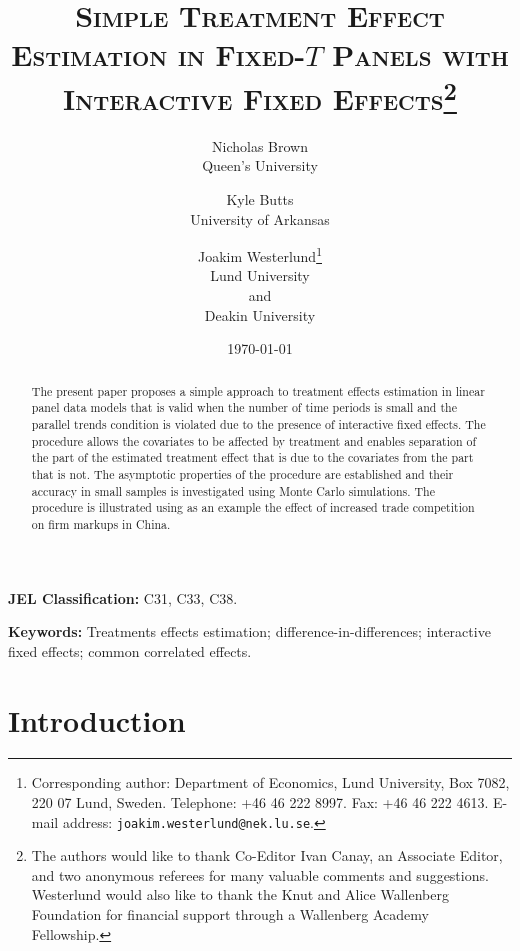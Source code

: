 \documentclass[12pt,fleqn]{article}
\title{\textsc{Simple Treatment Effect Estimation in Fixed-$T$ Panels with Interactive Fixed Effects}\thanks{The authors would like to thank Co-Editor Ivan Canay, an Associate Editor, and two anonymous referees for many valuable comments and suggestions. Westerlund would also like to thank the Knut and Alice Wallenberg Foundation for financial support through a Wallenberg Academy Fellowship.}}
\author{
    \and Nicholas Brown\\
    {\small Queen's University} \and Kyle Butts\\
    {\small University of Arkansas} \and Joakim Westerlund\thanks{Corresponding author: Department of Economics, Lund University, Box 7082, 220 07 Lund, Sweden. Telephone: +46 46 222 8997. Fax: +46 46 222 4613. E-mail address: \texttt{joakim.westerlund@nek.lu.se}.}\\
    {\small Lund University}\\
    {\small and}\\
    {\small Deakin University}
}
\date{\today}
\begin{document}
\maketitle


\begin{abstract}
  \setlength{\baselineskip}{0.83cm}
  The present paper proposes a simple approach to treatment effects estimation in linear panel data models that is valid when the number of time periods is small and the parallel trends condition is violated due to the presence of interactive fixed effects. The procedure allows the covariates to be affected by treatment and enables separation of the part of the estimated treatment effect that is due to the covariates from the part that is not. The asymptotic properties of the procedure are established and their accuracy in small samples is investigated using Monte Carlo simulations. The procedure is illustrated using as an example the effect of increased trade competition on firm markups in China.
  \end{abstract}
  
  \setlength{\baselineskip}{0.83cm}
  
  \textbf{JEL Classification:} C31, C33, C38.
  
  \textbf{Keywords:} Treatments effects estimation; difference-in-differences; interactive fixed effects; common correlated effects.
  
  \section{Introduction}
  
\end{document}
